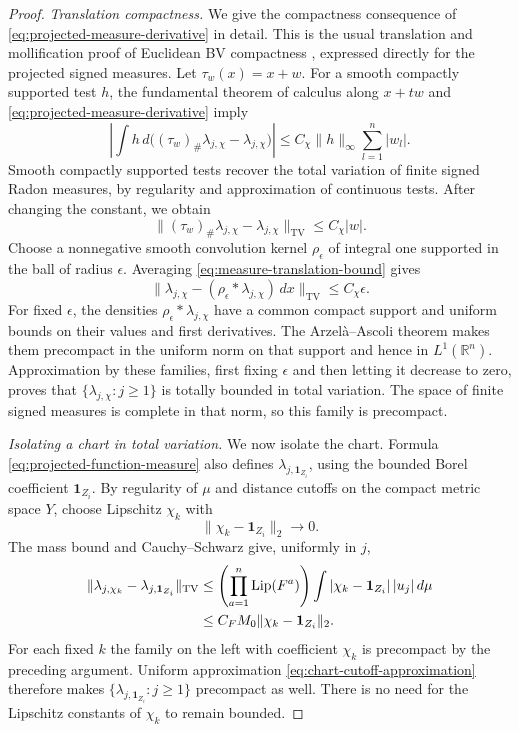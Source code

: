 \documentclass[11pt]{article}
\numberwithin{equation}{section}
\theoremstyle{definition}
\theoremstyle{remark}
\begin{document}
\begin{proof}
\emph{Translation compactness.}
We give the compactness consequence of
\eqref{eq:projected-measure-derivative} in detail. This is the usual
translation and mollification proof of Euclidean BV compactness
\cite[Chapter~2, Theorem~2.6]{Simon2014}, expressed directly for the
projected signed measures.  Let
$\tau_w(x)=x+w$.  For a smooth compactly supported test $h$, the
fundamental theorem of calculus along $x+tw$ and
\eqref{eq:projected-measure-derivative} imply
\[
 \left|\int h\,d\bigl((\tau_w)_\#\lambda_{j,\chi}
                              -\lambda_{j,\chi}\bigr)\right|
 \le C_\chi\|h\|_\infty\sum_{l=1}^n|w_l|.
\]
Smooth compactly supported tests recover the total variation of
finite signed Radon measures, by regularity and approximation of
continuous tests.  After changing the constant, we obtain
\begin{equation}
 \| (\tau_w)_\#\lambda_{j,\chi}-\lambda_{j,\chi}\|_{\mathrm{TV}}
 \le C_\chi|w|.
 \label{eq:measure-translation-bound}
\end{equation}
Choose a nonnegative smooth convolution kernel $\rho_\epsilon$ of
integral one supported in the ball of radius $\epsilon$.  Averaging
\eqref{eq:measure-translation-bound} gives
\[
 \|\lambda_{j,\chi}-(\rho_\epsilon*\lambda_{j,\chi})\,dx\|_{\mathrm{TV}}
 \le C_\chi\epsilon.
\]
For fixed $\epsilon$, the densities
$\rho_\epsilon*\lambda_{j,\chi}$ have a common compact support and
uniform bounds on their values and first derivatives.  The
Arzel\`a--Ascoli theorem makes them precompact in the uniform norm
on that support and hence in $L^1(\mathbb R^n)$.  Approximation by these
families, first fixing $\epsilon$ and then letting it decrease to
zero, proves that $\{\lambda_{j,\chi}:j\ge1\}$ is totally bounded
in total variation.  The space of finite signed measures is complete
in that norm, so this family is precompact.

\emph{Isolating a chart in total variation.}
We now isolate the chart.  Formula
\eqref{eq:projected-function-measure} also defines
$\lambda_{j,\mathbf1_{Z_i}}$, using the bounded Borel coefficient
$\mathbf1_{Z_i}$.  By regularity of $\mu$ and distance cutoffs on the
compact metric space $Y$, choose Lipschitz $\chi_k$ with
\[
 \|\chi_k-\mathbf1_{Z_i}\|_2\longrightarrow0.
\]
The mass bound and Cauchy--Schwarz give, uniformly in $j$,
\begin{align}
 \|\lambda_{j,\chi_k}-\lambda_{j,\mathbf1_{Z_i}}\|_{\mathrm{TV}}
 &\le \left(\prod_{a=1}^n\operatorname{Lip}(F^a)\right)
       \int|\chi_k-\mathbf1_{Z_i}|\,|u_j|\,d\mu \notag\\
 &\le C_FM_0\|\chi_k-\mathbf1_{Z_i}\|_2.
 \label{eq:chart-cutoff-approximation}
\end{align}
For each fixed $k$ the family on the left with coefficient $\chi_k$
is precompact by the preceding argument.  Uniform approximation
\eqref{eq:chart-cutoff-approximation} therefore makes
$\{\lambda_{j,\mathbf1_{Z_i}}:j\ge1\}$ precompact as well.  There is
no need for the Lipschitz constants of $\chi_k$ to remain bounded.


\end{proof}
\end{document}
